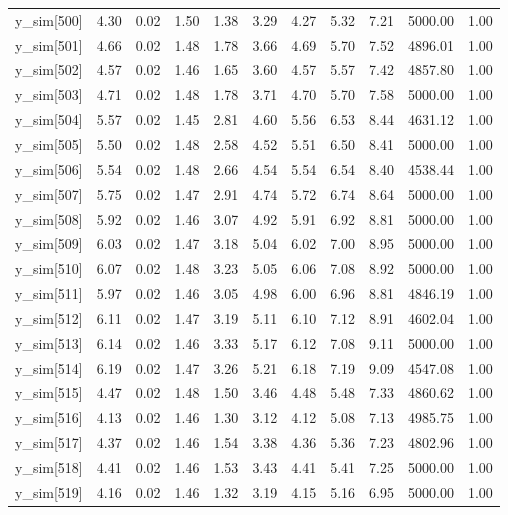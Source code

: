 \begin{table}[ht]
\begin{tabular}{rrrrrrrrrrr}
  y\_sim[500] & 4.30 & 0.02 & 1.50 & 1.38 & 3.29 & 4.27 & 5.32 & 7.21 & 5000.00 & 1.00 \\ 
  y\_sim[501] & 4.66 & 0.02 & 1.48 & 1.78 & 3.66 & 4.69 & 5.70 & 7.52 & 4896.01 & 1.00 \\ 
  y\_sim[502] & 4.57 & 0.02 & 1.46 & 1.65 & 3.60 & 4.57 & 5.57 & 7.42 & 4857.80 & 1.00 \\ 
  y\_sim[503] & 4.71 & 0.02 & 1.48 & 1.78 & 3.71 & 4.70 & 5.70 & 7.58 & 5000.00 & 1.00 \\ 
  y\_sim[504] & 5.57 & 0.02 & 1.45 & 2.81 & 4.60 & 5.56 & 6.53 & 8.44 & 4631.12 & 1.00 \\ 
  y\_sim[505] & 5.50 & 0.02 & 1.48 & 2.58 & 4.52 & 5.51 & 6.50 & 8.41 & 5000.00 & 1.00 \\ 
  y\_sim[506] & 5.54 & 0.02 & 1.48 & 2.66 & 4.54 & 5.54 & 6.54 & 8.40 & 4538.44 & 1.00 \\ 
  y\_sim[507] & 5.75 & 0.02 & 1.47 & 2.91 & 4.74 & 5.72 & 6.74 & 8.64 & 5000.00 & 1.00 \\ 
  y\_sim[508] & 5.92 & 0.02 & 1.46 & 3.07 & 4.92 & 5.91 & 6.92 & 8.81 & 5000.00 & 1.00 \\ 
  y\_sim[509] & 6.03 & 0.02 & 1.47 & 3.18 & 5.04 & 6.02 & 7.00 & 8.95 & 5000.00 & 1.00 \\ 
  y\_sim[510] & 6.07 & 0.02 & 1.48 & 3.23 & 5.05 & 6.06 & 7.08 & 8.92 & 5000.00 & 1.00 \\ 
  y\_sim[511] & 5.97 & 0.02 & 1.46 & 3.05 & 4.98 & 6.00 & 6.96 & 8.81 & 4846.19 & 1.00 \\ 
  y\_sim[512] & 6.11 & 0.02 & 1.47 & 3.19 & 5.11 & 6.10 & 7.12 & 8.91 & 4602.04 & 1.00 \\ 
  y\_sim[513] & 6.14 & 0.02 & 1.46 & 3.33 & 5.17 & 6.12 & 7.08 & 9.11 & 5000.00 & 1.00 \\ 
  y\_sim[514] & 6.19 & 0.02 & 1.47 & 3.26 & 5.21 & 6.18 & 7.19 & 9.09 & 4547.08 & 1.00 \\ 
  y\_sim[515] & 4.47 & 0.02 & 1.48 & 1.50 & 3.46 & 4.48 & 5.48 & 7.33 & 4860.62 & 1.00 \\ 
  y\_sim[516] & 4.13 & 0.02 & 1.46 & 1.30 & 3.12 & 4.12 & 5.08 & 7.13 & 4985.75 & 1.00 \\ 
  y\_sim[517] & 4.37 & 0.02 & 1.46 & 1.54 & 3.38 & 4.36 & 5.36 & 7.23 & 4802.96 & 1.00 \\ 
  y\_sim[518] & 4.41 & 0.02 & 1.46 & 1.53 & 3.43 & 4.41 & 5.41 & 7.25 & 5000.00 & 1.00 \\ 
  y\_sim[519] & 4.16 & 0.02 & 1.46 & 1.32 & 3.19 & 4.15 & 5.16 & 6.95 & 5000.00 & 1.00 \\ 

\end{tabular}
\end{table}
